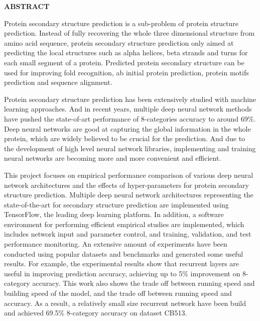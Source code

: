 \newpage
{}

\centerline{\bf \large ABSTRACT}
\vskip 10mm %
Protein secondary structure prediction is a sub-problem of protein structure prediction. Instead of fully recovering the whole three dimensional structure from amino acid sequence, protein secondary structure prediction only aimed at predicting the local structures such as alpha helices, beta strands and turns for each small segment of a protein. Predicted protein secondary structure can be used for improving fold recognition, ab initial protein prediction, protein motifs prediction and sequence alignment.

Protein secondary structure prediction has been extensively studied with machine learning approaches. And in recent years, multiple deep neural network methods have pushed the state-of-art performance of 8-categories accuracy to around 69\%. Deep neural networks are good at capturing the global information in the whole protein, which are widely believed to be crucial for the prediction. And due to the development of high level neural network libraries, implementing and training neural networks are becoming more and more convenient and efficient.

This project focuses on empirical performance comparison of various deep neural network architectures and the effects of hyper-parameters for protein secondary structure prediction. Multiple deep neural network architectures representing the state-of-the-art for secondary structure prediction are implemented using TensorFlow, the leading deep learning platform. In addition, a software environment for performing efficient empirical studies are implemented, which includes network input and parameter control, and training, validation,  and test performance monitoring. An extensive amount of experiments have been conducted using popular datasets and benchmarks and generated some useful results. For example, the experimental results show that recurrent layers are useful in improving prediction accuracy, achieving up to 5\% improvement on 8-category accuracy. This work also shows the trade off between running speed and building speed of the model, and the trade off between running speed and accuracy. As a result, a relatively small size recurrent network have been build and achieved 69.5\% 8-category accuracy on dataset CB513. 